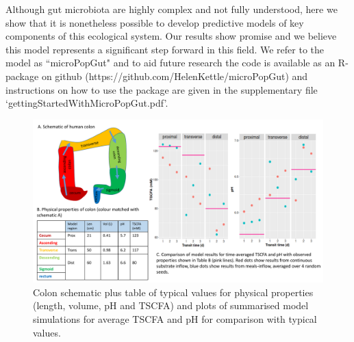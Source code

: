 \documentclass[a4paper]{article}
\begin{document}
Although gut microbiota are highly complex and not fully understood, here we show that it is nonetheless possible to develop predictive models of key components of this ecological system. Our results show promise and we believe this model represents a significant step forward in this field. We refer to the model as ``microPopGut" and to aid future research the code is available as an R-package on github (https://github.com/HelenKettle/microPopGut) and instructions on how to use the package are given in the supplementary file `gettingStartedWithMicroPopGut.pdf'.

\begin{figure}
    \centering
      \includegraphics[scale=0.35]{images/colon4.pdf}
    \caption{Colon schematic plus table of typical values for physical properties (length, volume, pH and TSCFA) and plots of summarised model simulations for average TSCFA and pH for comparison with typical values. 
    }
    \label{fig:Validation}
\end{figure}
\end{document}
